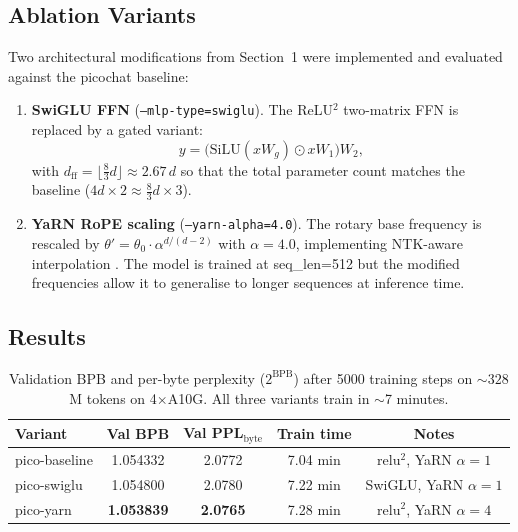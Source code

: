 \documentclass[a4paper,12pt]{article}
\begin{document}
\subsection{Ablation Variants}

\noindent Two architectural modifications from Section~1 were implemented and
evaluated against the picochat baseline:

\begin{enumerate}
  \item \textbf{SwiGLU FFN} (\texttt{--mlp-type=swiglu}).  The
        ReLU$^2$ two-matrix FFN is replaced by a gated variant:
        \[
          y = \bigl(\mathrm{SiLU}(xW_g) \odot xW_1\bigr)W_2,
        \]
        with $d_\text{ff} = \lfloor\tfrac{8}{3} d\rfloor \approx 2.67\,d$
        so that the total parameter count matches the baseline
        ($4d \times 2 \approx \tfrac{8}{3}d \times 3$).

  \item \textbf{YaRN RoPE scaling} (\texttt{--yarn-alpha=4.0}).  The
        rotary base frequency is rescaled by
        $\theta' = \theta_0 \cdot \alpha^{d/(d-2)}$ with $\alpha = 4.0$,
        implementing NTK-aware interpolation \cite{peng2023yarn}.  The
        model is trained at seq\_len=512 but the modified frequencies
        allow it to generalise to longer sequences at inference time.
\end{enumerate}

\subsection{Results}

\begin{table}[H]
\centering
\begin{tabular}{lcccc}
\toprule
\textbf{Variant} & \textbf{Val BPB} & \textbf{Val PPL$_\text{byte}$} & \textbf{Train time} & \textbf{Notes} \\
\midrule
pico-baseline & 1.054332 & 2.0772 & 7.04 min & relu$^2$, YaRN $\alpha=1$ \\
pico-swiglu   & 1.054800 & 2.0780 & 7.22 min & SwiGLU, YaRN $\alpha=1$   \\
pico-yarn     & \textbf{1.053839} & \textbf{2.0765} & 7.28 min & relu$^2$, YaRN $\alpha=4$  \\
\bottomrule
\end{tabular}
\caption{Validation BPB and per-byte perplexity ($2^\text{BPB}$) after 5000 training steps on
  ${\sim}328$M tokens on 4$\times$A10G. All three variants train in $\sim$7 minutes.}
\label{tab:ablation_results}
\end{table}
\end{document}
